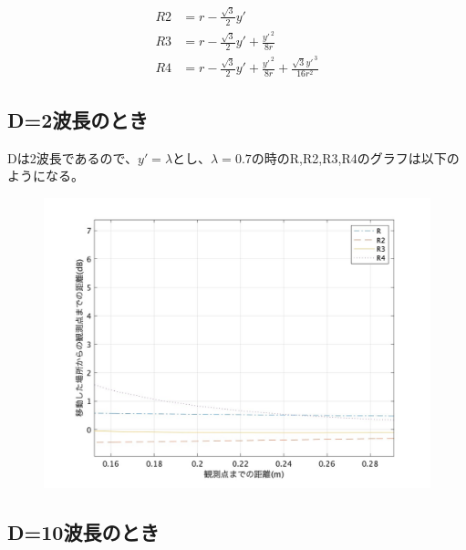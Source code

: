 \documentclass[dvipdfmx,autodetect-engine,titlepage]{jsarticle}
\begin{document}
\begin{align*}
  R2 &= r - \frac{\sqrt{3}}{2}y'\\
  R3 &= r - \frac{\sqrt{3}}{2}y' + \frac{y'^{\,2}}{8r} \\
  R4 &= r - \frac{\sqrt{3}}{2}y' + \frac{y'^{\,2}}{8r} + \frac{\sqrt{3}y'^{\,3}}{16r^2}
\end{align*}


\subsection{D=2波長のとき}

Dは2波長であるので、\begin{math} y'=\lambda\end{math}とし、\begin{math}
  \lambda = 0.7\end{math}の時のR,R2,R3,R4のグラフは以下のようになる。

\begin{figure}[h]
  \centering
  \includegraphics[scale=0.3]{week4_3.jpg}
  \caption{}
\end{figure}


\subsection{D=10波長のとき}
\end{document}
